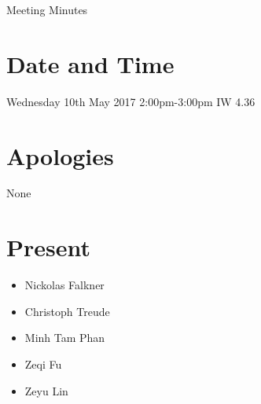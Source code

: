 \documentclass[11pt, a4paper]{article}
\begin{document}
\vspace*{15pt}

\begin{center}
\huge Meeting Minutes




\end{center}

\section{Date and Time}
 Wednesday 10th May 2017 2:00pm-3:00pm IW 4.36

\section{Apologies}
None

\section{Present}
\begin{itemize}
	\item Nickolas Falkner
	\item Christoph Treude 
	\item Minh Tam Phan
	\item Zeqi Fu
	\item Zeyu Lin
\end{itemize}
\end{document}

